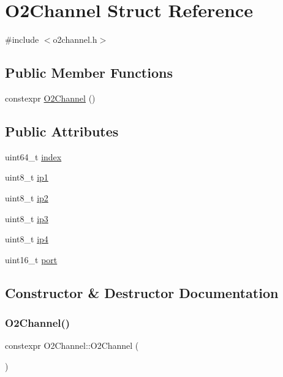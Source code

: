 \hypertarget{structO2Channel}{}\section{O2\+Channel Struct Reference}
\label{structO2Channel}


{\ttfamily \#include $<$o2channel.\+h$>$}

\subsection*{Public Member Functions}
\begin{DoxyCompactItemize}
\item 
constexpr \hyperlink{structO2Channel_a1e8e6d0ac511b09dcfe18c3bc8f75679}{O2\+Channel} ()
\end{DoxyCompactItemize}
\subsection*{Public Attributes}
\begin{DoxyCompactItemize}
\item 
uint64\+\_\+t \hyperlink{structO2Channel_a15fa4484248ca16fed1e2a01f2f7c60b}{index}
\item 
uint8\+\_\+t \hyperlink{structO2Channel_ab98cae5d3b4bd99e24f390768e566d92}{ip1}
\item 
uint8\+\_\+t \hyperlink{structO2Channel_a5c53ed651c9528ae0b829787464a85ae}{ip2}
\item 
uint8\+\_\+t \hyperlink{structO2Channel_a2f051c18cee18aaad3a2bb2cb1d38849}{ip3}
\item 
uint8\+\_\+t \hyperlink{structO2Channel_a2ba8f4cb989b053772766b3dddcd78a9}{ip4}
\item 
uint16\+\_\+t \hyperlink{structO2Channel_a68207433b6e0df1f34cbbf1bf68945ed}{port}
\end{DoxyCompactItemize}


\subsection{Constructor \& Destructor Documentation}
\mbox{\label{structO2Channel_a1e8e6d0ac511b09dcfe18c3bc8f75679}} 
\subsubsection{\texorpdfstring{O2\+Channel()}{O2Channel()}}
{\footnotesize\ttfamily constexpr O2\+Channel\+::\+O2\+Channel (\begin{DoxyParamCaption}{ }\end{DoxyParamCaption})\hspace{0.3cm}{\ttfamily [inline]}}




